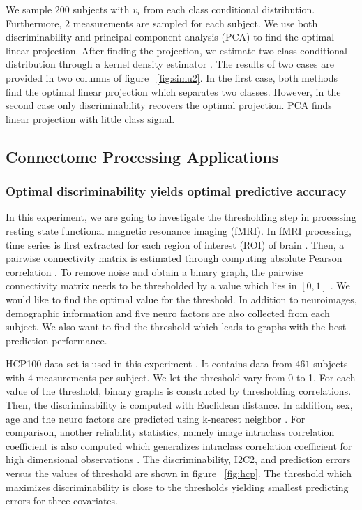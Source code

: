 \documentclass{article}
\begin{document}
We sample $200$ subjects with $v_i$ from each class conditional distribution. Furthermore, $2$ measurements are sampled for each subject. We use both discriminability and principal component analysis (PCA) \cite{jolliffe2002principal} to find the optimal linear projection. After finding the projection, we estimate two class conditional distribution through a kernel density estimator \cite{silverman1986density}. The results of two cases are provided in two columns of figure ~\ref{fig:simu2}. In the first case, both methods find the optimal linear projection which separates two classes. However, in the second case only discriminability recovers the optimal projection. PCA finds linear projection with little class signal.




\subsection{Connectome Processing Applications}

\subsubsection{Optimal discriminability yields optimal predictive accuracy}
In this experiment, we are going to investigate the thresholding step in processing resting state functional magnetic resonance imaging (fMRI). In fMRI processing, time series is first extracted for each region of interest (ROI) of brain \cite{strother2006evaluating}. Then, a pairwise connectivity matrix is estimated through computing absolute Pearson correlation \cite{liang2012effects}. To remove noise and obtain a binary graph, the pairwise connectivity matrix needs to be thresholded by a value which lies in $[0,1]$ \cite{hampson2002detection,van2010exploring}. We would like to find the optimal value for the threshold. In addition to neuroimages, demographic information and five neuro factors \cite{costa1992revised} are also collected from each subject. We also want to find the threshold which leads to graphs with the best prediction performance.  

HCP100 data set is used in this experiment \cite{van2012human}. It contains data from $461$ subjects with $4$ measurements per subject. We let the threshold vary from 0 to 1. For each value of the threshold, binary graphs is constructed by thresholding correlations. Then, the discriminability is computed with Euclidean distance. In addition, sex, age and the neuro factors are predicted using k-nearest neighbor \cite{vapnik1998statistical}. For comparison, another reliability statistics, namely image intraclass correlation coefficient is also computed which generalizes intraclass correlation coefficient for high dimensional observations \cite{shou2013quantifying}. The discriminability, I2C2, and prediction errors versus the values of threshold are shown in figure ~\ref{fig:hcp}. The threshold which maximizes discriminability is close to the thresholds yielding smallest predicting errors for three covariates. 
\end{document}
